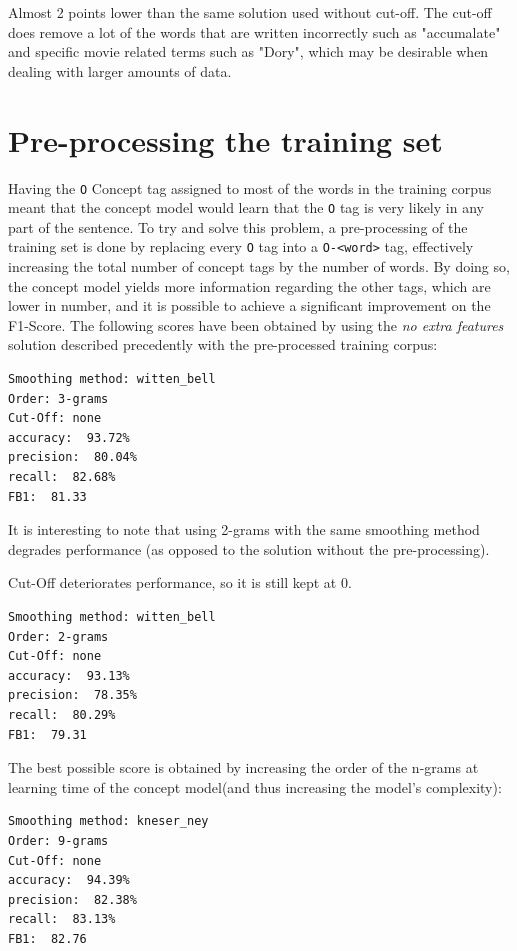 \documentclass[11pt,a4paper]{article}
\begin{document}
Almost 2 points lower than the same solution used without cut-off.
The cut-off does remove a lot of the words that are written incorrectly such as "accumalate" and specific movie related terms such as "Dory", which may be desirable when dealing with larger amounts of data.

\section{Pre-processing the training set}

Having the \verb|O| Concept tag assigned to most of the words in the training corpus meant that the concept model would learn that the \verb|O| tag is very likely in any part of the sentence.
To try and solve this problem, a pre-processing of the training set is done by replacing every \verb|O| tag into a \verb|O-<word>| tag, effectively increasing the total number of concept tags by the number of words.
By doing so, the concept model yields more information regarding the other tags, which are lower in number, and it is possible to achieve a significant improvement on the F1-Score. The following scores have been obtained by using the \textit{no extra features} solution described precedently with the pre-processed training corpus:

\begin{verbatim}
Smoothing method: witten_bell
Order: 3-grams
Cut-Off: none
accuracy:  93.72%
precision:  80.04%
recall:  82.68%
FB1:  81.33
\end{verbatim}

It is interesting to note that using 2-grams with the same smoothing method degrades performance (as opposed to the solution without the pre-processing).

Cut-Off deteriorates performance, so it is still kept at 0.

\begin{verbatim}
Smoothing method: witten_bell
Order: 2-grams
Cut-Off: none
accuracy:  93.13%
precision:  78.35%
recall:  80.29%
FB1:  79.31
\end{verbatim}

The best possible score is obtained by increasing the order of the n-grams at learning time of the concept model(and thus increasing the model's complexity):

\begin{verbatim}
Smoothing method: kneser_ney
Order: 9-grams
Cut-Off: none
accuracy:  94.39%
precision:  82.38%
recall:  83.13%
FB1:  82.76
\end{verbatim}
\end{document}
